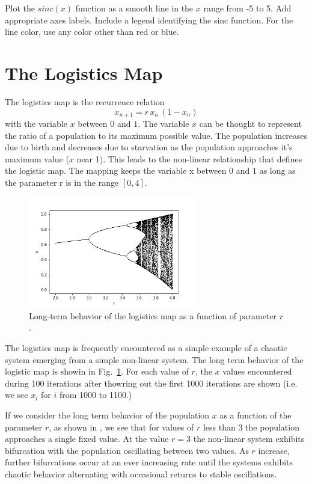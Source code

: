 \plot Plot the $sinc(x)$ function as a smooth line in the $x$ range from -5
to 5.  Add appropriate axes labels.  Include a legend identifying the
sinc function.  For the line color, use any color other than red or
blue.

\section{The Logistics Map}
The logistics map is the recurrence relation
\begin{displaymath}
x_{n+1} = r \, x_n \, (1 - x_n)
\end{displaymath}
with the variable $x$ between $0$ and $1$.  The variable $x$ can be
thought to represent the ratio of a population to its maximum possible
value.  The population increases due to birth and decreases due to
starvation as the population approaches it's maximum value ($x$ near
1).  This leads to the non-linear relationship that defines the
logistic map.  The mapping keeps the variable x between $0$ and $1$ as
long as the parameter r is in the range $[0,4]$.

\begin{figure}[htbp]
\begin{center}
\includegraphics[width=0.65\textwidth]{figs/plotting/logmap.png} 
\caption{Long-term behavior of the logistics map as a function of parameter $r$.}
\label{fig:logmap}
\end{center}
\end{figure}

The logistics map is frequently encountered as a simple example of a
chaotic system emerging from a simple non-linear system.  The long
term behavior of the logistic map is showin in Fig.~\ref{fig:logmap}.
For each value of $r$, the $x$ values encountered during 100
iterations after thowring out the first 1000 iterations are shown
(i.e. we see $x_i$ for $i$ from 1000 to 1100.)


If we
consider the long term behavior of the population $x$ as a function of
the parameter $r$, as shown in , we see that for
values of $r$ less than $3$ the population approaches a single fixed
value.  At the value $r=3$ the non-linear system exhibits bifurcation
with the population oscillating between two values.  As $r$ increase,
further bifurcations occur at an ever increasing rate until the
systems exhibits chaotic behavior alternating with occasional returns
to stable oscillations.


